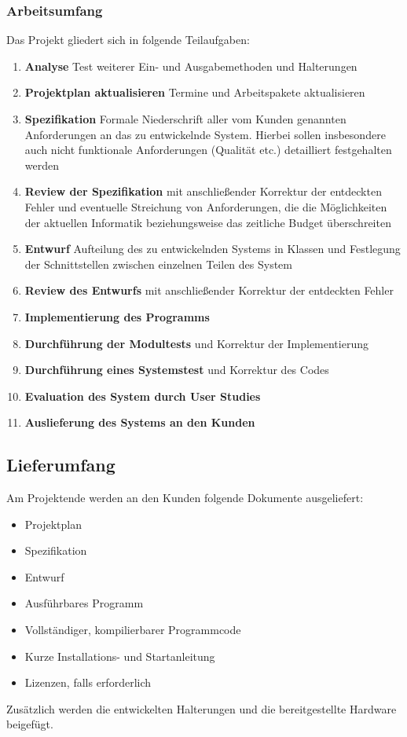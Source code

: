 \subsubsection{Arbeitsumfang}
Das Projekt gliedert sich in folgende Teilaufgaben:
\begin{enumerate}
	\item \textbf{Analyse} Test weiterer Ein- und Ausgabemethoden und Halterungen
	\item \textbf{Projektplan aktualisieren} Termine und Arbeitspakete \ggf aktualisieren
	\item \textbf{Spezifikation} Formale Niederschrift aller vom Kunden genannten Anforderungen an das zu entwickelnde System. Hierbei sollen insbesondere auch nicht funktionale Anforderungen (\bzgl Qualität etc.) detailliert festgehalten werden
	\item \textbf{Review der Spezifikation} mit anschließender Korrektur der entdeckten Fehler und eventuelle Streichung von Anforderungen, die die Möglichkeiten der aktuellen Informatik beziehungsweise das zeitliche Budget überschreiten
	\item \textbf{Entwurf} Aufteilung des zu entwickelnden Systems in Klassen und Festlegung der Schnittstellen zwischen einzelnen Teilen des System
	\item \textbf{Review des Entwurfs} mit anschließender Korrektur der entdeckten Fehler
	\item \textbf{Implementierung des Programms}
	\item \textbf{Durchführung der Modultests} und \ggf Korrektur der Implementierung
	\item \textbf{Durchführung eines Systemstest} und \ggf Korrektur des Codes
	\item \textbf{Evaluation des System durch User Studies}
	\item \textbf{Auslieferung  des Systems an den Kunden}
\end{enumerate}

\subsection{Lieferumfang}
Am Projektende werden an den Kunden folgende Dokumente ausgeliefert:
\begin{itemize}
	\item Projektplan
	\item Spezifikation
	\item Entwurf
	\item Ausführbares Programm
	\item Vollständiger, kompilierbarer Programmcode
	\item Kurze Installations- und Startanleitung
	\item Lizenzen, falls erforderlich
\end{itemize}
Zusätzlich werden die entwickelten Halterungen und die bereitgestellte Hardware beigefügt.

